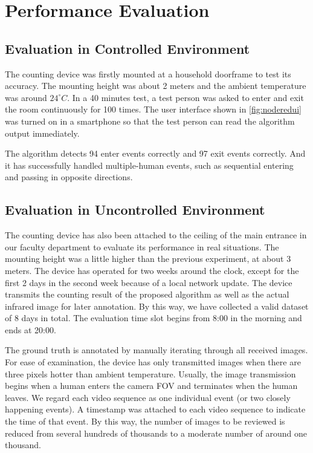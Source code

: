 \chapter{Performance Evaluation} \label{ch:evaluation}
\section{Evaluation in Controlled Environment}
The counting device was firstly mounted at a household doorframe to test its accuracy. The mounting height was about 2 meters and the ambient temperature was around $24^\circ C$. In a 40 minutes test, a test person was asked to enter and exit the room continuously for 100 times. The user interface shown in \autoref{fig:noderedui} was turned on in a smartphone so that the test person can read the algorithm output immediately.

The algorithm detects 94 enter events correctly and 97 exit events correctly. And it has successfully handled multiple-human events, such as sequential entering and passing in opposite directions.
\section{Evaluation in Uncontrolled Environment}
The counting device has also been attached to the ceiling of the main entrance in our faculty department to evaluate its performance in real situations. The mounting height was a little higher than the previous experiment, at about 3 meters. The device has operated for two weeks around the clock, except for the first 2 days in the second week because of a local network update. The device transmits the counting result of the proposed algorithm as well as the actual infrared image for later annotation. By this way, we have collected a valid dataset of 8 days in total. The evaluation time slot begins from 8:00 in the morning and ends at 20:00.

The ground truth is annotated by manually iterating through all received images. For ease of examination, the device has only transmitted images when there are three pixels hotter than ambient temperature. Usually, the image transmission begins when a human enters the camera FOV and terminates when the human leaves. We regard each video sequence as one individual event (or two closely happening events). A timestamp was attached to each video sequence to indicate the time of that event. By this way, the number of images to be reviewed is reduced from several hundreds of thousands to a moderate number of around one thousand.

